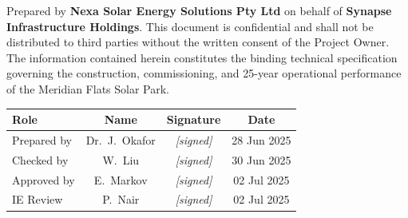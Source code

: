\documentclass[11pt, a4paper]{article}
\begin{document}
\vspace{8mm}

\begin{center}
  \begin{minipage}{0.78\linewidth}
    \small\color{SolarSlate}\centering
    Prepared by \textbf{Nexa Solar Energy Solutions Pty Ltd} on behalf of
    \textbf{Synapse Infrastructure Holdings}. This document is confidential and
    shall not be distributed to third parties without the written consent of the
    Project Owner. The information contained herein constitutes the binding technical
    specification governing the construction, commissioning, and 25-year operational
    performance of the Meridian Flats Solar Park.
  \end{minipage}
\end{center}

\vspace{10mm}

\begin{center}
\begin{tabular}{@{} l c c c @{}}
  \toprule
  \rowcolor{SolarMist}
  \textbf{Role} & \textbf{Name} & \textbf{Signature} & \textbf{Date} \\
  \midrule
  Prepared by  & Dr.~J.~Okafor   & \textit{[signed]} & 28 Jun 2025 \\
  Checked by   & W.~Liu          & \textit{[signed]} & 30 Jun 2025 \\
  Approved by  & E.~Markov       & \textit{[signed]} & 02 Jul 2025 \\
  IE Review    & P.~Nair         & \textit{[signed]} & 02 Jul 2025 \\
  \bottomrule
\end{tabular}
\end{center}

\newpage

\tableofcontents
\thispagestyle{fancy}

\newpage



\newpage



\newpage



\newpage


\end{document}
